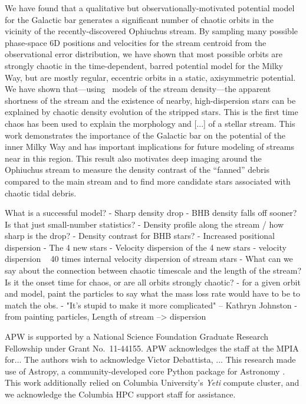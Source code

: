\documentclass[letterpaper,12pt,preprint]{aastex}
\begin{document}
We have found that a qualitative but observationally-motivated potential model for the Galactic bar generates a significant number of chaotic orbits in the vicinity of the recently-discovered Ophiuchus stream. By sampling many possible phase-space 6D positions and velocities for the stream centroid from the observational error distribution, we have shown that most possible orbits are strongly chaotic in the time-dependent, barred potential model for the Milky Way, but are mostly regular, eccentric orbits in a static, axisymmetric potential. We have shown that---using \streakline\ models of the stream density---the apparent shortness of the stream and the existence of nearby, high-dispersion stars can be explained by chaotic density evolution of the stripped stars. This is the first time chaos has been used to explain the morphology and [...] of a stellar stream. This work demonstrates the importance of the Galactic bar on the potential of the inner Milky Way and has important implications for future modeling of streams near in this region. This result also motivates deep imaging around the Ophiuchus stream to measure the density contrast of the ``fanned'' debris compared to the main stream and to find more candidate stars associated with chaotic tidal debris.

What is a successful model?
- Sharp density drop
	- BHB density falls off sooner? Is that just small-number statistics?
	- Density profile along the stream / how sharp is the drop?
	- Density contrast for BHB stars?
- Increased positional dispersion
	- The 4 new stars
- Velocity dispersion of the 4 new stars
	- velocity dispersion ~ 40 times internal velocity dispersion of stream stars
- What can we say about the connection between chaotic timescale and the length of the stream? Is it the onset time for chaos, or are all orbits strongly chaotic?
	- for a given orbit and model, paint the particles to say what the mass loss rate would have to be to match the obs.
- "It's stupid to make it more complicated" -- Kathryn Johnston
- from painting particles, Length of stream --> dispersion

\acknowledgements
APW is supported by a National Science Foundation Graduate Research Fellowship under Grant No.\ 11-44155.
APW acknowledges the staff at the MPIA for...
The authors wish to acknowledge Victor Debattista, ...
This research made use of Astropy, a community-developed core Python package for Astronomy \citep{astropy13}.
This work additionally relied on Columbia University's \emph{Yeti} compute cluster, and we acknowledge the Columbia HPC support staff for assistance. \\
\end{document}

